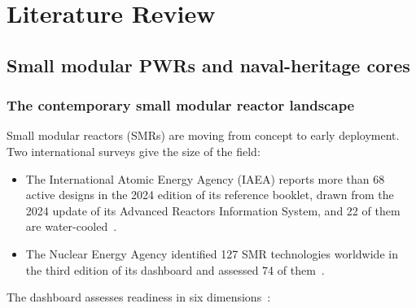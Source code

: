 \providecommand{\openpoint}[1]{\par\noindent\fbox{\parbox{0.97\linewidth}{%
  \textbf{Open point:} #1}}\par}

\chapter{Literature Review}
\label{ch:litreview}

\section{Small modular PWRs and naval-heritage cores}
\label{sec:smr-naval}

\subsection{The contemporary small modular reactor landscape}
\label{subsec:smr-landscape}

Small modular reactors (SMRs) are moving from concept to early
deployment. Two international surveys give the size of the field:

\begin{itemize}
  \item The International Atomic Energy Agency (IAEA) reports more than
        68 active designs in the 2024 edition of its reference booklet,
        drawn from the 2024 update of its Advanced Reactors Information
        System, and 22 of them are water-cooled~\cite{iaea_smr_2024}.

  \item The Nuclear Energy Agency identified 127 SMR technologies
        worldwide in the third edition of its dashboard and assessed 74
        of them~\cite{nea_dashboard_2025}.
\end{itemize}

The dashboard assesses readiness in six
dimensions~\cite{nea_dashboard_2025}:

